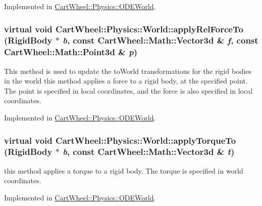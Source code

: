 Implemented in \hyperlink{classCartWheel_1_1Physics_1_1ODEWorld_a7a8c8fc31b0dac181d6d397cd6b70e06}{CartWheel::Physics::ODEWorld}.

\hypertarget{classCartWheel_1_1Physics_1_1World_a87da6dd55397da4ceceaa457be2e1a89}{
\subsubsection[{applyRelForceTo}]{\setlength{\rightskip}{0pt plus 5cm}virtual void CartWheel::Physics::World::applyRelForceTo ({\bf RigidBody} $\ast$ {\em b}, \/  const {\bf CartWheel::Math::Vector3d} \& {\em f}, \/  const {\bf CartWheel::Math::Point3d} \& {\em p})}}
\label{classCartWheel_1_1Physics_1_1World_a87da6dd55397da4ceceaa457be2e1a89}
This method is used to update the toWorld transformations for the rigid bodies in the world this method applies a force to a rigid body, at the specified point. The point is specified in local coordinates, and the force is also specified in local coordinates. 

Implemented in \hyperlink{classCartWheel_1_1Physics_1_1ODEWorld_a3403766a4fa655a7b2d0df7a409a990e}{CartWheel::Physics::ODEWorld}.

\hypertarget{classCartWheel_1_1Physics_1_1World_ae4f6992b0360ac2599a8980621cde06f}{
\subsubsection[{applyTorqueTo}]{\setlength{\rightskip}{0pt plus 5cm}virtual void CartWheel::Physics::World::applyTorqueTo ({\bf RigidBody} $\ast$ {\em b}, \/  const {\bf CartWheel::Math::Vector3d} \& {\em t})}}
\label{classCartWheel_1_1Physics_1_1World_ae4f6992b0360ac2599a8980621cde06f}
this method applies a torque to a rigid body. The torque is specified in world coordinates. 

Implemented in \hyperlink{classCartWheel_1_1Physics_1_1ODEWorld_a99608efa452523e74cc61cd7cbafb496}{CartWheel::Physics::ODEWorld}.

